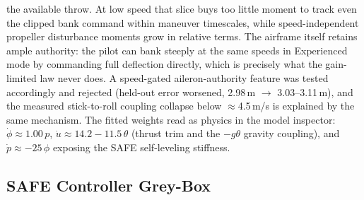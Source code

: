 \documentclass[11pt]{article}
\begin{document}
the available throw. At low speed that slice buys too little moment to
track even the clipped bank command within maneuver timescales, while
speed-independent propeller disturbance moments grow in relative terms.
The airframe itself retains ample authority: the pilot can bank steeply at
the same speeds in Experienced mode by commanding full deflection
directly, which is precisely what the gain-limited law never does. A
speed-gated aileron-authority feature was tested accordingly and rejected
(held-out error worsened, 2.98\,m $\rightarrow$ 3.03--3.11\,m), and the
measured stick-to-roll coupling collapse below $\approx$4.5\,m/s is
explained by the same mechanism. The
fitted weights read as physics in the model inspector:
$\dot\phi\approx1.00\,p$, $\dot u\approx14.2-11.5\,\theta$ (thrust trim and
the $-g\theta$ gravity coupling), and $\dot p\approx-25\,\phi$ exposing the
SAFE self-leveling stiffness.

\subsection{SAFE Controller Grey-Box}
\end{document}
